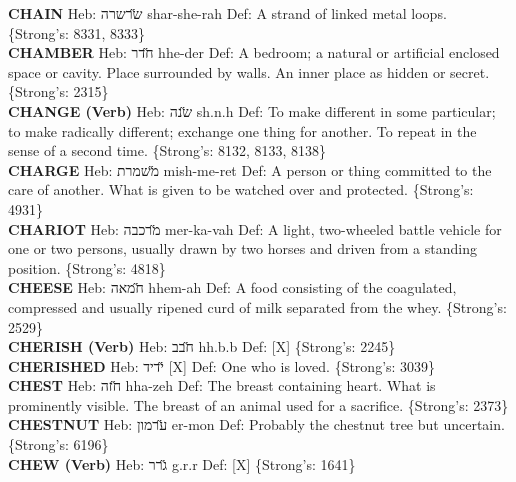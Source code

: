 {\textbf{CHAIN} Heb: {\large\H שרשרה} shar-she-rah Def: A strand of linked metal loops. \{Strong's: 8331, 8333\}\hfill{}\\

\textbf{CHAMBER} Heb: {\large\H חדר} hhe-der Def: A bedroom; a natural or artificial enclosed space or cavity. Place surrounded by walls. An inner place as hidden or secret. \{Strong's: 2315\}\hfill{}\\

\textbf{CHANGE (Verb)} Heb: {\large\H שנה} sh.n.h Def: To make different in some particular; to make radically different; exchange one thing for another. To repeat in the sense of a second time. \{Strong's: 8132, 8133, 8138\}\hfill{}\\

\textbf{CHARGE} Heb: {\large\H משמרת} mish-me-ret Def: A person or thing committed to the care of another. What is given to be watched over and protected. \{Strong's: 4931\}\hfill{}\\

\textbf{CHARIOT} Heb: {\large\H מרכבה} mer-ka-vah Def: A light, two-wheeled battle vehicle for one or two persons, usually drawn by two horses and driven from a standing position. \{Strong's: 4818\}\hfill{}\\

\textbf{CHEESE} Heb: {\large\H חמאה} hhem-ah Def: A food consisting of the coagulated, compressed and usually ripened curd of milk separated from the whey. \{Strong's: 2529\}\hfill{}\\

\textbf{CHERISH (Verb)} Heb: {\large\H חבב} hh.b.b Def: {[}X{]} \{Strong's: 2245\}\hfill{}\\

\textbf{CHERISHED} Heb: {\large\H ידיד} {[}X{]} Def: One who is loved. \{Strong's: 3039\}\hfill{}\\

\textbf{CHEST} Heb: {\large\H חזה} hha-zeh Def: The breast containing heart. What is prominently visible. The breast of an animal used for a sacrifice. \{Strong's: 2373\}\hfill{}\\

\textbf{CHESTNUT} Heb: {\large\H ערמון} er-mon Def: Probably the chestnut tree but uncertain. \{Strong's: 6196\}\hfill{}\\

\textbf{CHEW (Verb)} Heb: {\large\H גרר} g.r.r Def: {[}X{]} \{Strong's: 1641\}\hfill{}\\

}
